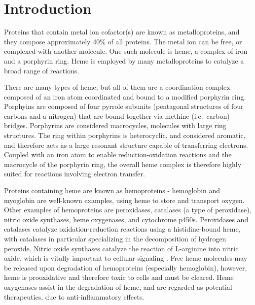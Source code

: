 \documentclass[a4paper, nobind]{templates/ociamthesis}
\begin{document}
\hypertarget{introduction}{%
\chapter*{Introduction}\label{introduction}}

\adjustmtc
{}

Proteins that contain metal ion cofactor(s) are known as metalloproteins, and they compose approximately 40\% of all proteins. The metal ion can be free, or complexed with another molecule. One such molecule is heme, a complex of iron and a porphyrin ring. Heme is employed by many metalloproteins to catalyze a broad range of reactions\autocite{Poulos2014}.

There are many types of heme; but all of them are a coordination complex composed of an iron atom coordinated and bound to a modified porphyrin ring. Porphyins are composed of four pyrrole subunits (pentagonal structures of four carbons and a nitrogen) that are bound together via methine (i.e.~carbon) bridges. Porphyrins are considered macrocycles, molecules with large ring structures. The ring within porphyrins is heterocyclic, and considered aromatic, and therefore acts as a large resonant structure capable of transferring electrons. Coupled with an iron atom to enable reduction-oxidation reactions and the macrocycle of the porphyrin ring, the overall heme complex is therefore highly suited for reactions involving electron transfer\autocite{Kleingardner2015}.

Proteins containing heme are known as hemoproteins - hemoglobin and myoglobin are well-known examples, using heme to store and transport oxygen. Other examples of hemoproteins are peroxidases, catalases (a type of peroxidase), nitric oxide synthases, heme oxygenases, and cytochrome p450s. Peroxidases and catalases catalyze oxidation-reduction reactions using a histidine-bound heme, with catalases in particular specializing in the decomposition of hydrogen peroxide. Nitric oxide synthases catalyze the reaction of L-arginine into nitric oxide, which is vitally important to cellular signaling \autocite{Poulos2014}. Free heme molecules may be released upon degradation of hemoproteins (especially hemoglobin), however, heme is prooxidative and therefore toxic to cells and must be cleared. Heme oxygenases assist in the degradation of heme, and are regarded as potential therapeutics, due to anti-inflammatory effects\autocite{Araujo2012}.
\end{document}
